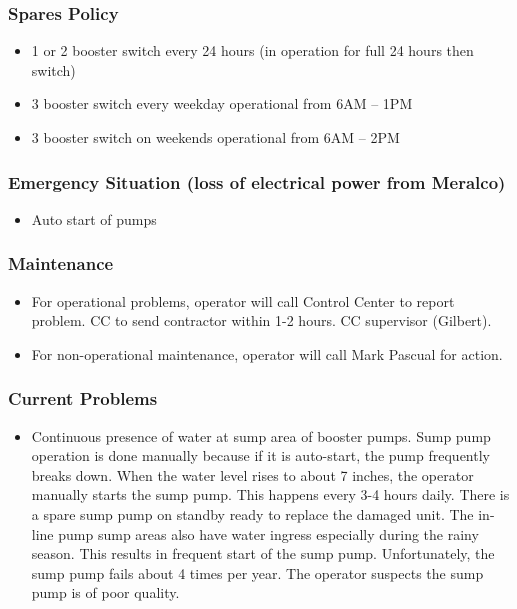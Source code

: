 %	
%

\subsubsection{Spares Policy}

\begin{itemize}
	\item 1 or 2 booster switch every 24 hours (in operation for full 24 hours then switch)
	\item 3 booster switch every weekday operational from 6AM – 1PM
	\item 3 booster switch on weekends operational from 6AM – 2PM
\end{itemize}

\subsubsection{Emergency Situation (loss of electrical power from Meralco)}
\begin{itemize}
	\item Auto start of pumps
\end{itemize}

\subsubsection{Maintenance}
\begin{itemize}
	\item For operational problems, operator will call Control Center to report problem.  CC to send contractor within 1-2 hours.  CC supervisor (Gilbert).  
	\item For non-operational maintenance, operator will call Mark Pascual for action.
\end{itemize}

\subsubsection{Current Problems}
\begin{itemize}
	\item Continuous presence of water at sump area of booster pumps.  Sump pump operation is done manually because if it is auto-start, the pump frequently breaks down. When the water level rises to about 7 inches, the operator manually starts the sump pump.  This happens every 3-4 hours daily.  There is a spare sump pump on standby ready to replace the damaged unit. The in-line pump sump areas also have water ingress especially during the rainy season.  This results in frequent start of the sump pump.  Unfortunately, the sump pump fails about 4 times per year.  The operator suspects the sump pump is of poor quality.
\end{itemize}


